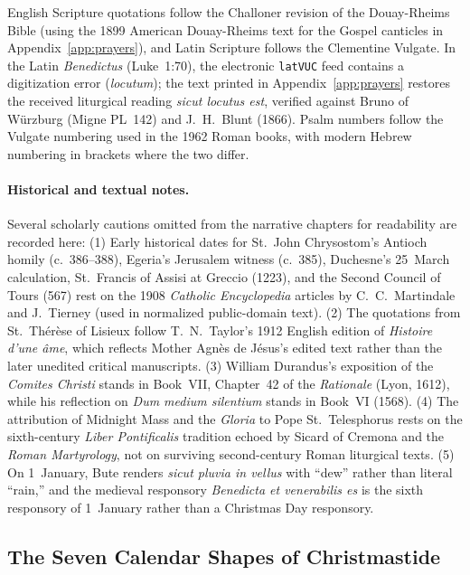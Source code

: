 English Scripture quotations follow the Challoner revision of the Douay-Rheims
Bible (using the 1899 American Douay-Rheims text for the Gospel canticles in
Appendix~\ref{app:prayers}), and Latin Scripture follows the Clementine Vulgate.
In the Latin \textit{Benedictus} (Luke~1:70), the electronic \texttt{latVUC}
feed contains a digitization error (\textit{locutum}); the text printed in
Appendix~\ref{app:prayers} restores the received liturgical reading
\textit{sicut locutus est}, verified against Bruno of W\"urzburg (Migne PL~142)
and J.~H.~Blunt (1866). Psalm numbers follow the Vulgate numbering used in the
1962 Roman books, with modern Hebrew numbering in brackets where the two differ.

\paragraph{Historical and textual notes.}
Several scholarly cautions omitted from the narrative chapters for readability
are recorded here: (1) Early historical dates for St.~John Chrysostom's Antioch
homily (c.~386--388), Egeria's Jerusalem witness (c.~385), Duchesne's 25~March
calculation, St.~Francis of Assisi at Greccio (1223), and the Second Council of
Tours (567) rest on the 1908 \textit{Catholic Encyclopedia} articles by
C.~C.~Martindale and J.~Tierney (used in normalized public-domain text). (2) The
quotations from St.~Th\'er\`ese of Lisieux follow T.~N.~Taylor's 1912 English
edition of \textit{Histoire d'une \^ame}, which reflects Mother Agn\`es de
J\'esus's edited text rather than the later unedited critical manuscripts. (3)
William Durandus's exposition of the \textit{Comites Christi} stands in Book~VII,
Chapter~42 of the \textit{Rationale} (Lyon, 1612), while his reflection on
\textit{Dum medium silentium} stands in Book~VI (1568). (4) The attribution of
Midnight Mass and the \textit{Gloria} to Pope St.~Telesphorus rests on the
sixth-century \textit{Liber Pontificalis} tradition echoed by Sicard of Cremona
and the \textit{Roman Martyrology}, not on surviving second-century Roman
liturgical texts. (5) On 1~January, Bute renders \textit{sicut pluvia in vellus}
with ``dew'' rather than literal ``rain,'' and the medieval responsory
\textit{Benedicta et venerabilis es} is the sixth responsory of 1~January rather
than a Christmas Day responsory.

\subsection{The Seven Calendar Shapes of Christmastide}

